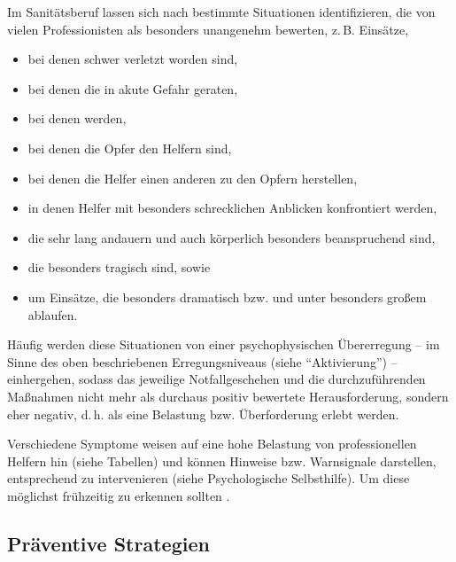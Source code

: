 Im Sanitätsberuf lassen sich nach 
bestimmte Situationen identifizieren, die von vielen Professionisten als besonders unangenehm
bewerten, z.\,B. Einsätze,
\begin{itemize}
  \item bei denen  schwer verletzt worden sind,
  \item bei denen die  in akute Gefahr
  geraten,
  \item bei denen 
  werden,
  \item bei denen die Opfer den Helfern  sind,
  \item bei denen die Helfer einen anderen  zu den Opfern herstellen,
  \item in denen Helfer mit besonders schrecklichen
  Anblicken konfrontiert werden,
  \item die sehr lang andauern und auch körperlich besonders
  beanspruchend sind,
  \item die besonders tragisch sind, sowie
  \item um Einsätze, die besonders dramatisch bzw.
   und unter besonders großem 
  ablaufen.
\end{itemize}

Häufig werden diese Situationen von einer psychophysischen
Übererregung -- im Sinne des oben beschriebenen
Erregungsniveaus (siehe \enquote{Aktivierung}) -- einhergehen,
sodass das jeweilige Notfallgeschehen und die durchzuführenden
Maßnahmen nicht mehr als durchaus positiv bewertete
Herausforderung, sondern eher negativ, d.\,h. als eine
Belastung bzw. Überforderung erlebt werden.


{
Verschiedene Symptome weisen auf eine hohe Belastung von
professionellen Helfern hin (siehe Tabellen) und können
Hinweise bzw. Warnsignale darstellen, entsprechend zu
intervenieren (siehe Psychologische Selbsthilfe). Um diese
möglichst frühzeitig zu erkennen sollten
.}
{}
{}
{}
{}





\subsection{Präventive Strategien}



